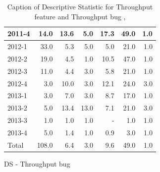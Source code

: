 \documentclass[UKenglish]{ifimaster}  %
\begin{document}
\begin{appendices}
\begin{table}[!htbp]
\begin{adjustwidth}{-2.5cm}{}
\begin{subfigure}[b]{0.3\textwidth}
{\begin{tabular}{ | l | r | r | r | r | r | r | }
2011-4 & 14.0 & 13.6 & 5.0 & 17.3 & 49.0 & 1.0\\ \hline
2012-1 & 33.0 & 5.3 & 5.0 & 5.0 & 21.0 & 1.0\\ \hline
2012-2 & 19.0 & 4.5 & 1.0 & 10.5 & 47.0 & 1.0\\ \hline
2012-3 & 11.0 & 4.4 & 3.0 & 5.8 & 21.0 & 1.0\\ \hline
2012-4 & 3.0 & 10.0 & 3.0 & 12.1 & 24.0 & 3.0\\ \hline
2013-1 & 3.0 & 7.0 & 3.0 & 8.7 & 17.0 & 1.0\\ \hline
2013-2 & 5.0 & 13.4 & 13.0 & 7.1 & 21.0 & 3.0\\ \hline
2013-3 & 1.0 & 1.0 & 1.0 & - & 1.0 & 1.0\\ \hline
2013-4 & 5.0 & 1.4 & 1.0 & 0.9 & 3.0 & 1.0\\ \hline
Total & 108.0 & 6.4 & 3.0 & 9.6 & 49.0 & 1.0\\ \hline
\end{tabular}
}
\caption{DS - Throughput bug}
 \label{DS:TPB:1}
\end{subfigure}
\end{adjustwidth}
\caption[Optional caption for list of figures]{Caption of Descriptive Statistic for Throughput feature and Throughput bug  , }
\label{DS:1:2}
\end{table}




\end{appendices}
\end{document}
